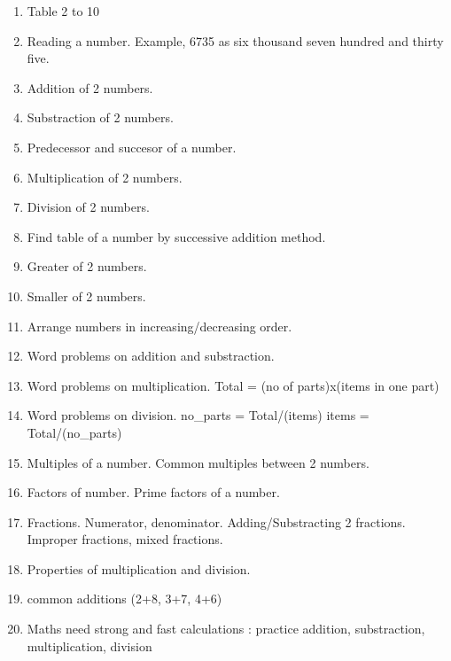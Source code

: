 
\begin{enumerate}
    \item Table 2 to 10
    \item Reading a number. Example, 6735 as six thousand seven hundred and thirty five.
    \item Addition of 2 numbers.
    \item Substraction of 2 numbers.
    \item Predecessor and succesor of a number.
    \item Multiplication of 2 numbers.
    \item Division of 2 numbers.
    \item Find table of a number by successive addition method.
    \item Greater of 2 numbers.
    \item Smaller of 2 numbers.
    \item Arrange numbers in increasing/decreasing order.
    \item Word problems on addition and substraction.
    \item Word problems on multiplication. Total = (no of parts)x(items in one part)
    \item Word problems on division. no_parts = Total/(items) \qquad  items = Total/(no_parts)
    \item Multiples of a number. Common multiples between 2 numbers.
    \item Factors of number. Prime factors of a number.
    \item Fractions. Numerator, denominator. Adding/Substracting 2 fractions. Improper fractions, mixed fractions.
    \item Properties of multiplication and division.
    \item common additions (2+8, 3+7, 4+6)
    \item Maths need strong and fast calculations : practice addition, substraction, multiplication, division
\end{enumerate}
